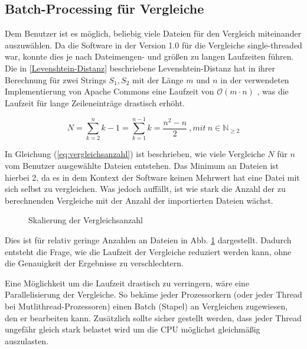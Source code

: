 \newpage


\newpage
\subsection{Batch-Processing für Vergleiche}
Dem Benutzer ist es möglich, beliebig viele Dateien für den Vergleich miteinander auszuwählen. Da die Software in der Version 1.0 für die Vergleiche single-threaded war, konnte dies je nach Dateimengen- und größen zu langen Laufzeiten führen. Die in \ref{Levenshtein-Distanz} beschriebene Levenshtein-Distanz hat in ihrer Berechnung für zwei Strings $S_1, S_2$ mit der Länge $m$ und $n$ in der verwendeten Implementierung von Apache Commons eine Laufzeit von $\mathcal{O}(m \cdot n)$ \autocite{levenshteinLaufzeit}, was die Laufzeit für lange Zeileneinträge drastisch erhöht.

\begin{equation}
    N = \sum_{k = 2}^{n} k-1 = \sum_{k=1}^{n-1} k = \frac{n ^ 2 -n}{2} \ ,mit \ n\in\mathbb{N}_{\geq2}
    \label{eq:vergleichsanzahl}
\end{equation}

In Gleichung (\ref{eq:vergleichsanzahl}) ist beschrieben, wie viele Vergleiche $N$ für $n$ vom Benutzer ausgewählte Dateien entstehen. Das Minimum an Dateien ist hierbei 2, da es in dem Kontext der Software keinen Mehrwert hat eine Datei mit sich selbst zu vergleichen. Was jedoch auffällt, ist wie stark die Anzahl der zu berechnenden Vergleiche mit der Anzahl der importierten Dateien wächst.

\begin{figure}[!htb]
\centering

\caption{Skalierung der Vergleichsanzahl}
\label{fig:vergleichsskalierung}
\end{figure}

Dies ist für relativ geringe Anzahlen an Dateien in Abb. \ref{fig:vergleichsskalierung} dargestellt. Dadurch entsteht die Frage, wie die Laufzeit der Vergleiche reduziert werden kann, ohne die Genauigkeit der Ergebnisse zu verschlechtern.

Eine Möglichkeit um die Laufzeit drastisch zu verringern, wäre eine Parallelisierung der Vergleiche. So bekäme jeder Prozessorkern (oder jeder Thread bei Mutlithread-Prozessoren) einen Batch (Stapel) an Vergleichen zugewiesen, den er bearbeiten kann. Zusätzlich sollte sicher gestellt werden, dass jeder Thread ungefähr gleich stark belastet wird um die CPU möglichst gleichmäßig auszulasten.

